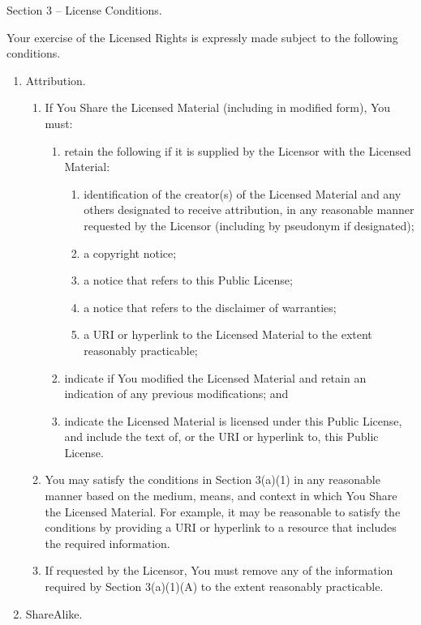 \documentclass[]{scrbook}
\begin{document}
Section 3 -- License Conditions.

Your exercise of the Licensed Rights is expressly made subject to the
following conditions.

\begin{enumerate}
\def\labelenumi{\alph{enumi}.}
\item
  Attribution.

  \begin{enumerate}
  \def\labelenumii{\arabic{enumii}.}
  \item
    If You Share the Licensed Material (including in modified form), You
    must:

    \begin{enumerate}
    \def\labelenumiii{\alph{enumiii}.}
    \item
      retain the following if it is supplied by the Licensor with the
      Licensed Material:

      \begin{enumerate}
      \def\labelenumiv{\roman{enumiv}.}
      \item
        identification of the creator(s) of the Licensed Material and
        any others designated to receive attribution, in any reasonable
        manner requested by the Licensor (including by pseudonym if
        designated);
      \item
        a copyright notice;
      \item
        a notice that refers to this Public License;
      \item
        a notice that refers to the disclaimer of warranties;
      \item
        a URI or hyperlink to the Licensed Material to the extent
        reasonably practicable;
      \end{enumerate}
    \item
      indicate if You modified the Licensed Material and retain an
      indication of any previous modifications; and
    \item
      indicate the Licensed Material is licensed under this Public
      License, and include the text of, or the URI or hyperlink to, this
      Public License.
    \end{enumerate}
  \item
    You may satisfy the conditions in Section 3(a)(1) in any reasonable
    manner based on the medium, means, and context in which You Share
    the Licensed Material. For example, it may be reasonable to satisfy
    the conditions by providing a URI or hyperlink to a resource that
    includes the required information.
  \item
    If requested by the Licensor, You must remove any of the information
    required by Section 3(a)(1)(A) to the extent reasonably practicable.
  \end{enumerate}
\item
  ShareAlike.


\end{enumerate}
\end{document}
